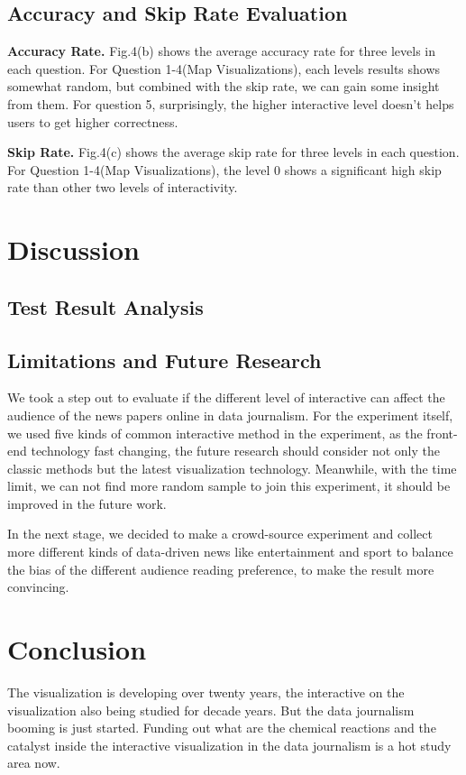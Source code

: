 \documentclass[9pt,journal,compsoc]{IEEEtran}
\begin{document}
\subsection{Accuracy and Skip Rate Evaluation}
\textbf{Accuracy Rate.} Fig.4(b) shows the average accuracy rate for three levels in each question. For Question 1-4(Map Visualizations), each levels results shows somewhat random, but combined with the skip rate, we can gain some insight from them. For question 5, surprisingly, the higher interactive level doesn't helps users to get higher correctness.

\textbf{Skip Rate.} Fig.4(c) shows the average skip rate for three levels in each question. For Question 1-4(Map Visualizations), the level 0 shows a significant high skip rate than other two levels of interactivity. \\

\section{Discussion}
\large
\subsection{Test Result Analysis}


\subsection{Limitations and Future Research}
We took a step out to evaluate if the different level of interactive can affect the audience of the news papers online in data journalism. For the experiment itself, we used five kinds of common interactive method in the experiment, as the front-end technology fast changing, the future research should consider not only the classic methods but the latest visualization technology. Meanwhile, with the time limit, we can not find more random sample to join this experiment, it should be improved in the future work.

In the next stage, we decided to make a crowd-source experiment and collect more different kinds of data-driven news like entertainment and sport to balance the bias of the different audience reading preference, to make the result more convincing.

\section{Conclusion}
\large
The visualization is developing over twenty years, the interactive on the visualization also being studied for decade years. But the data journalism booming is just started. Funding out what are the chemical reactions and the catalyst inside the interactive visualization in the data journalism is a hot study area now.
\end{document}
